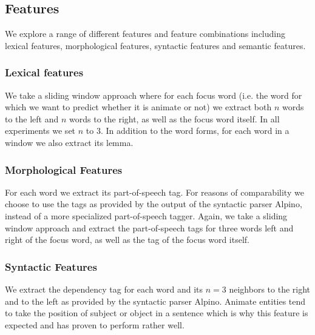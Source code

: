 \documentclass[a4paper,UKenglish]{oasics}
\begin{document}
\subsection{Features}

We explore a range of different features and feature combinations
including lexical features, morphological features, syntactic features
and semantic features.

\subsubsection{Lexical features}
We take a sliding window approach where for each focus word (i.e. the
word for which we want to predict whether it is animate or not) we
extract both $n$ words to the left and $n$ words to the right, as well
as the focus word itself. In all experiments we set $n$ to 3. In
addition to the word forms, for each word in a window we also extract
its lemma.

\subsubsection{Morphological Features}
For each word we extract its part-of-speech tag. For reasons of
comparability we choose to use the tags as provided by the output of
the syntactic parser Alpino, instead of a more specialized
part-of-speech tagger. Again, we take a sliding window approach and
extract the part-of-speech tags for three words left and right of the
focus word, as well as the tag of the focus word itself.
\subsubsection{Syntactic Features}
We extract the dependency tag for each word and its $n=3$ neighbors to
the right and to the left as provided by the syntactic parser
Alpino. Animate entities tend to take the position of subject or
object in a sentence which is why this feature is expected and has
proven to perform rather well.
\end{document}
